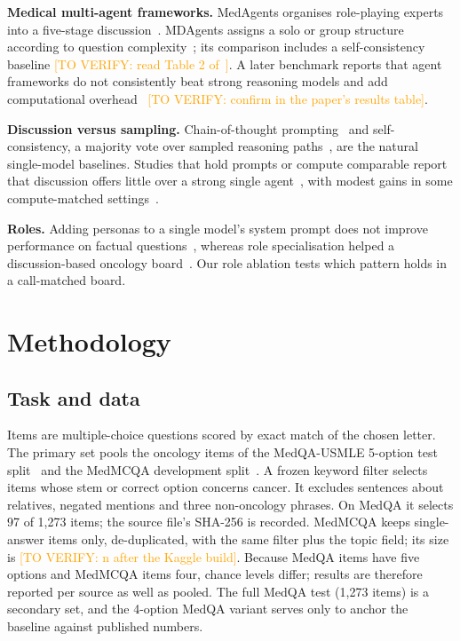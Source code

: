 \IfFileExists{IEEEtran.cls}{\documentclass[conference]{IEEEtran}}{\documentclass[10pt,twocolumn]{article}\usepackage[margin=0.75in]{geometry}}
\newcommand{\toverify}[1]{\textcolor{orange}{[TO VERIFY: #1]}}
\begin{document}
\textbf{Medical multi-agent frameworks.} MedAgents organises role-playing experts into a five-stage discussion~\cite{tang2024medagents}. MDAgents assigns a solo or group structure according to question complexity~\cite{kim2024mdagents}; its comparison includes a self-consistency baseline \toverify{read Table 2 of~\cite{kim2024mdagents}}. A later benchmark reports that agent frameworks do not consistently beat strong reasoning models and add computational overhead~\cite{shao2025medagentsbench} \toverify{confirm in the paper's results table}.

\textbf{Discussion versus sampling.} Chain-of-thought prompting~\cite{wei2022cot,kojima2022zeroshot} and self-consistency, a majority vote over sampled reasoning paths~\cite{wang2023selfconsistency}, are the natural single-model baselines. Studies that hold prompts or compute comparable report that discussion offers little over a strong single agent~\cite{wang2024rethinking,smit2023mad}, with modest gains in some compute-matched settings~\cite{wunderlich2026pareto}.

\textbf{Roles.} Adding personas to a single model's system prompt does not improve performance on factual questions~\cite{zheng2024personas}, whereas role specialisation helped a discussion-based oncology board~\cite{kim2025mlhc}. Our role ablation tests which pattern holds in a call-matched board.

\section{Methodology}
\subsection{Task and data}
Items are multiple-choice questions scored by exact match of the chosen letter. The primary set pools the oncology items of the MedQA-USMLE 5-option test split~\cite{jin2021medqa} and the MedMCQA development split~\cite{pal2022medmcqa}. A frozen keyword filter selects items whose stem or correct option concerns cancer. It excludes sentences about relatives, negated mentions and three non-oncology phrases. On MedQA it selects 97 of 1{,}273 items; the source file's SHA-256 is recorded. MedMCQA keeps single-answer items only, de-duplicated, with the same filter plus the topic field; its size is \toverify{n after the Kaggle build}. Because MedQA items have five options and MedMCQA items four, chance levels differ; results are therefore reported per source as well as pooled. The full MedQA test (1{,}273 items) is a secondary set, and the 4-option MedQA variant serves only to anchor the baseline against published numbers.
\end{document}
